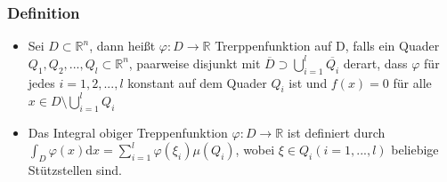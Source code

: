 \subsubsection{Definition}
\begin{itemize}
	\item Sei $D\subset \mathbb{R}^n$, dann heißt $\varphi \colon D \to \mathbb{R}$ Trerppenfunktion auf D, falls ein Quader $Q_1, Q_2,..., Q_l \subset \mathbb{R}^n$, paarweise disjunkt mit $\overline{D} \supset \bigcup_{i=1}^l \overline{Q_i}$ derart, dass $\varphi$ für jedes $i = 1,2,...,l$ konstant auf dem Quader $Q_i$ ist und $f(x) = 0$ für alle $x \in D \setminus \bigcup_{i=1}^l Q_i$
	\item Das Integral obiger Treppenfunktion $\varphi \colon D \to \mathbb{R}$ ist definiert durch $\int_{D} \varphi(x) \text{d}x = \sum_{i= 1}^{l} \varphi(\xi_i)\mu(Q_i)$, wobei $\xi \in Q_i (i=1,...,l)$ beliebige Stützstellen sind.

\end{itemize}
